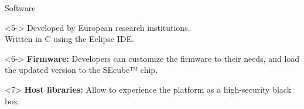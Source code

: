 \documentclass[14pt,usenames,dvipsnames]{beamer}
\begin{document}
\begin{frame}
\begin{columns}
{\begin{block}{Software}
{				\begin{block}<5->{}
  			  Developed by European research institutions. \\
  			  Written in C using the Eclipse IDE. 
	  			
				\end{block}
								\vspace{-0.2cm}

				\begin{block}<6->{}
				   \textbf{Firmware:}
				   Developers can customize the firmware to their needs, and load the updated version to the SEcube™ chip.
				\end{block}				
								\vspace{-0.2cm}

				\begin{block}<7>{}
				  \textbf{Host libraries:}
           Allow to experience the platform as a high-security black box.
				\end{block}
				
		}		
	  \end{block}
	  }
	  \endminipage      
  
  \end{columns}
\end{frame}
\end{document}
